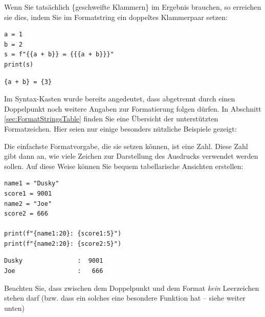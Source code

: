 Wenn Sie tatsächlich \{geschweifte Klammern\} im Ergebnis brauchen, so erreichen sie dies, indem Sie im Formatstring ein doppeltes Klammerpaar setzen:
\begin{codebox}
\begin{verbatim}
a = 1
b = 2
s = f"{{a + b}} = {{{a + b}}}"
print(s)
\end{verbatim}
\end{codebox}
\begin{cmdbox}
\begin{verbatim}
{a + b} = {3}
\end{verbatim}
\end{cmdbox}

Im Syntax-Kasten wurde bereits angedeutet, dass abgetrennt durch einen Doppelpunkt noch weitere Angaben zur Formatierung folgen dürfen. In Abschnitt \ref{sec:FormatStringsTable} finden Sie eine Übersicht der unterstützten Formatzeichen. Hier seien nur einige besonders nützliche Beispiele gezeigt:

Die einfachste Formatvorgabe, die sie setzen können, ist eine Zahl. Diese Zahl gibt dann an, wie viele Zeichen zur Darstellung des Ausdrucks verwendet werden sollen. Auf diese Weise können Sie bequem tabellarische Ansichten erstellen:

\begin{codebox}
\begin{verbatim}
name1 = "Dusky"
score1 = 9001
name2 = "Joe"
score2 = 666

print(f"{name1:20}: {score1:5}")
print(f"{name2:20}: {score2:5}")
\end{verbatim}
\end{codebox}
\begin{cmdbox}
\begin{verbatim}
Dusky               :  9001
Joe                 :   666
\end{verbatim}
\end{cmdbox}

Beachten Sie, dass zwischen dem Doppelpunkt und dem Format \emph{kein} Leerzeichen stehen darf (bzw. dass ein solches eine besondere Funktion hat -- siehe weiter unten)

